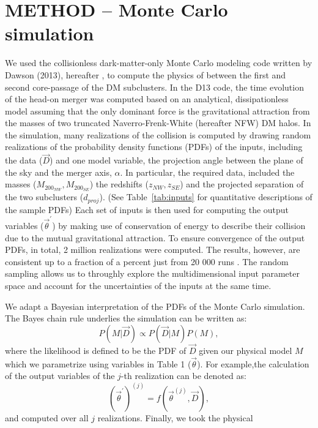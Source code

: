 \section{METHOD -- Monte Carlo simulation} 
We used the collisionless 
dark-matter-only Monte Carlo modeling code written by Dawson (2013),
hereafter , to compute the physics of between
the first and second core-passage of the DM subclusters. 
In the D13 code, the time evolution of the
head-on merger was computed based on an analytical, dissipationless model
assuming that the only dominant force is the gravitational attraction from
the masses of two truncated Naverro-Frenk-White (hereafter NFW) DM halos. 
In the simulation, many realizations of the collision is
computed by drawing random realizations of the probability density
functions (PDFs) of the inputs, including
the data ($\vec{D}$) and one model variable, the projection angle between
the plane of the sky and the merger axis, $\alpha$. In particular,
the required data, included the masses ($M_{200_{NW}},M_{200_{SE}}$) the
redshifts ($z_{NW}, z_{SE}$) and the projected separation of the two
subclusters ($d_{proj}$).  (See Table~\ref{tab:inputs}
for quantitative descriptions of the sample PDFs) 
Each set of inputs is then used for computing the output variables
($\vec{\theta}^\prime$) by making use of conservation of energy to describe
their collision due to the mutual gravitational attraction.
To ensure convergence of the output PDFs, in total, 2 million realizations
were computed. 
The results, however, are consistent up to a fraction of a percent just
from 20 000 runs . The random sampling allows us to
throughly explore the multidimensional input parameter space and account
for the uncertainties of the inputs at the same time.
\par    
We adapt a Bayesian interpretation of the PDFs of the Monte Carlo
simulation. The Bayes chain rule underlies the simulation can be written as:
\begin{equation}
    P(M|\vec{D}) \propto P(\vec{D}|M)P(M),
\end{equation}
where the likelihood is defined to be the PDF of $\vec{D}$ given our
physical model $M$ which we parametrize using variables in Table 1
($\vec{\theta}$).
For example,the
calculation of the output variables of the $j$-th realization can be denoted as: 
\begin{equation}
    (\vec{\theta}^\prime)^{(j)} = f(\vec{\theta}^{(j)}, \vec{D}), 
\end{equation}    
and computed over all $j$ realizations. Finally, we took the physical

